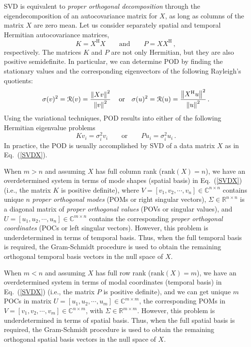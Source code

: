 \documentclass[10pt]{article}
\newcommand{\norm}[1]{\left\Vert#1\right\Vert}
\newcommand{\eq}[1]{Eq.\ (\ref{#1})}
\begin{document}
SVD is equivalent to {\em proper orthogonal decomposition} through the eigendecomposition of an autocovariance matrix for $X$, as long as columns of the matrix $X$ are zero mean.
Let us consider separately spatial and temporal Hermitian autocovariance matrices,
\begin{equation}
    K = %
    X^\mathrm{H}X \qquad \mathrm{and} \qquad P =  %
    XX^\mathrm{H}\,,
\end{equation}
respectively. 
The matrices $K$ and $P$ are not only Hermitian, but they are also positive semidefinite.
In particular, we can determine POD by finding the stationary values and the corresponding eigenvectors of the following Rayleigh's quotients:
\begin{equation}
    \sigma(v)^2={\cal R}(v) = \frac{\norm{Xv}^2}{\norm{v}^2}\,\quad \mathrm{or} \quad \sigma(u)^2={\cal R}(u) = \frac{\norm{X^\mathrm{H}u}^2}{\norm{u}^2}\,.
\end{equation}
Using the variational techniques, POD results into either of the following Hermitian eigenvalue problems
\begin{equation}
    K v_i = \sigma_i^2 v_i \qquad \mathrm{or} \qquad P u_i= \sigma_i^2 u_i\,.
\end{equation}
In practice, the POD is usually accomplished by SVD of a data matrix $X$ as in \eq{SVDX}.

When $m > n$ and assuming $X$ has full column rank ($\mathrm{rank}(X) = n$), we have an overdetermined system in terms of mode shapes (spatial basis) in \eq{SVDX} (i.e., the matrix $K$ is positive definite), where $V = [v_1, v_2, \cdots, v_n] \in \mathbb{C}^{n\times n}$ contains unique $n$ {\em proper orthogonal modes} (POMs or right singular vectors), $\Sigma \in \mathbb{R}^{n\times n}$ is a diagonal matrix of {\em proper orthogonal values} (POVs or singular values), and $U = [u_1, u_2, \cdots, u_n]\in \mathbb{C}^{m\times n}$ contains the corresponding {\em proper orthogonal coordinates} (POCs or left singular vectors). However, this problem is underdetermined in terms of temporal basis. Thus, when the full temporal basis is required, the Gram-Schmidt procedure is used to obtain the remaining orthogonal temporal basis vectors in the null space of $X$.

When $m < n$ and assuming $X$ has full row rank ($\mathrm{rank}(X) = m$), we have an overdetermined system in terms of modal coordinates (temporal basis) in \eq{SVDX} (i.e., the matrix $P$ is positive definite), and we can get unique $m$ POCs in matrix $U = [u_1, u_2, \cdots , u_m] \in \mathbb{C}^{m\times m}$, the corresponding POMs in $V = [v_1, v_2, \cdots, v_m] \in\mathbb{C}^{n\times m}$, with $\Sigma \in \mathbb{R}^{m\times m}$. However, this problem is underdetermined in terms of spatial basis. Thus, when the full spatial basis is required, the Gram-Schmidt procedure is used to obtain the remaining orthogonal spatial basis vectors in the null space of $X$.
\end{document}
